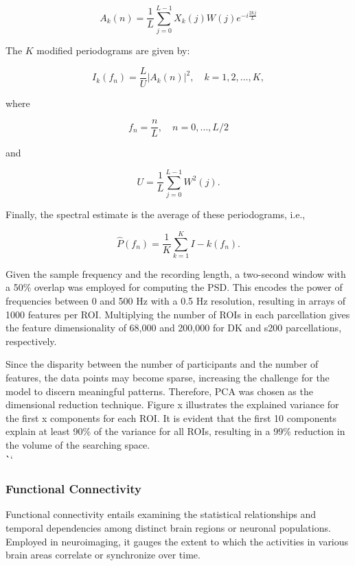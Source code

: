 \documentclass{cys}
\begin{document}
\begin{equation}
A_k(n) = \frac{1}{L} \sum_{j=0}^{L-1}X_k(j)W(j)e^{-i{\frac{2kj}{L}}}
\end{equation} 


\smallskip
The $K$ modified periodograms are given by:

\begin{equation}
I_k(f_n)=\frac{L}{U}|A_k(n)|^2, \quad k=1,2,\ldots,K,
\end{equation} 

where

\begin{equation*}
f_n=\frac{n}{L}, \quad n=0,\ldots,L/2
\end{equation*}

and

\begin{equation*}
U=\frac{1}{L}\sum_{j=0}^{L-1} W^2(j).
\end{equation*}

\smallskip
Finally, the spectral estimate is the average of these periodograms, i.e., 


\begin{equation}
\hat{P}(f_n)=\frac{1}{K}\sum_{k=1}^K I-k(f_n).
\end{equation}


Given the sample frequency and the recording length, a two-second window with a 50\% overlap was employed for computing the PSD. This encodes the power of frequencies between 0 and 500 Hz with a 0.5 Hz resolution, resulting in arrays of 1000 features per ROI. Multiplying the number of ROIs in each parcellation gives the feature dimensionality of 68,000 and 200,000 for DK and s200 parcellations, respectively.


\bigskip
Since the disparity between the number of participants and the number of features, the data points may become sparse, increasing the challenge for the model to discern meaningful patterns. Therefore, PCA was chosen as the dimensional reduction technique. Figure x illustrates the explained variance for the first x components for each ROI. It is evident that the first 10 components explain at least 90\% of the variance for all ROIs, resulting in a 99\% reduction in the volume of the searching space.
\\\```
\subsubsection{Functional Connectivity}

\smallskip
Functional connectivity entails examining the statistical relationships and temporal dependencies among distinct brain regions or neuronal populations. Employed in neuroimaging, it gauges the extent to which the activities in various brain areas correlate or synchronize over time.
\end{document}
